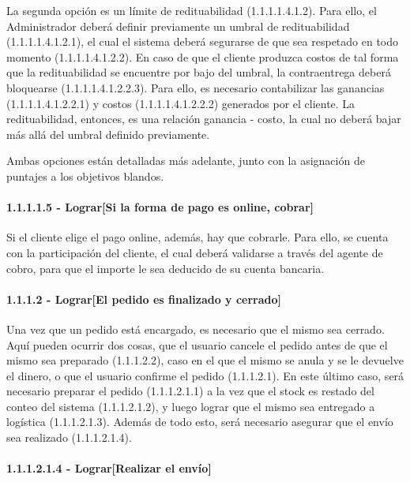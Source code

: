 La segunda opción es un límite de redituabilidad (1.1.1.1.4.1.2).
Para ello, el Administrador deberá definir previamente un umbral de
redituabilidad (1.1.1.1.4.1.2.1), el cual el sistema deberá segurarse de que sea
respetado en todo momento (1.1.1.1.4.1.2.2). En caso de que el cliente produzca
costos de tal forma que la redituabilidad se encuentre por bajo del umbral, la
contraentrega deberá bloquearse (1.1.1.1.4.1.2.2.3). Para ello, es necesario
contabilizar las ganancias (1.1.1.1.4.1.2.2.1) y costos (1.1.1.1.4.1.2.2.2)
generados por el cliente. La redituabilidad, entonces, es una relación
ganancia - costo, la cual no deberá bajar más allá del umbral definido
previamente.

Ambas opciones están detalladas más adelante, junto con la asignación de
puntajes a los objetivos blandos.

\paragraph{1.1.1.1.5 - Lograr[Si la forma de pago es online, cobrar]} \label{para:1.1.1.1.5}

Si el cliente elige el pago online, además, hay que cobrarle. Para ello, se
cuenta con la participación del cliente, el cual deberá validarse a través del
agente de cobro, para que el importe le sea deducido de su cuenta bancaria.

\clearpage
\paragraph{1.1.1.2 - Lograr[El pedido es finalizado y cerrado]} \label{para:1.1.1.2}

Una vez que un pedido está encargado, es necesario que el mismo sea cerrado.
Aquí pueden ocurrir dos cosas, que el usuario cancele el pedido antes de que el
mismo sea preparado (1.1.1.2.2), caso en el que el mismo se anula y se le
devuelve el dinero, o que el usuario confirme el pedido (1.1.1.2.1). En este
último caso, será necesario preparar el pedido (1.1.1.2.1.1) a la vez que el
stock es restado del conteo del sistema (1.1.1.2.1.2), y luego lograr que el
mismo sea entregado a logística (1.1.1.2.1.3). Además de todo esto, será
necesario asegurar que el envío sea realizado (1.1.1.2.1.4).

\paragraph{1.1.1.2.1.4 - Lograr[Realizar el envío]} \label{para:1.1.1.2.1.4}

